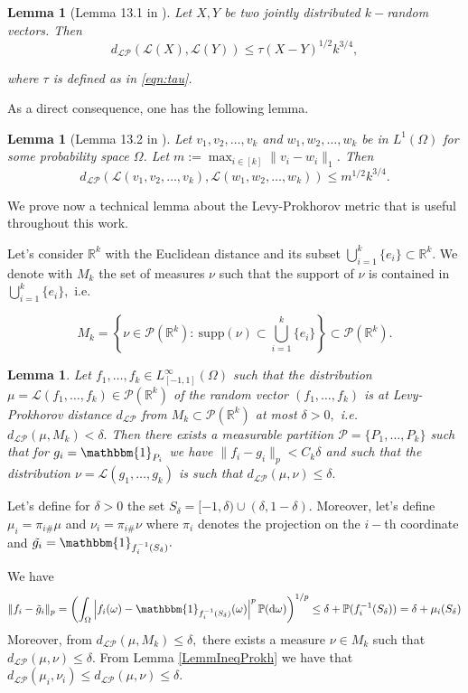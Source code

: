 \documentclass[11pt]{article}
\newtheorem{lemma}[theorem]{Lemma}
\def\R{\mathbb{R}}
\def\P{\mathbb{P}}
\newcommand{\cP}{{\mathcal P}}  %
\renewcommand{\P}{\mathbb{P}}
\newcommand{\drv}{\mathrm{d}}
\begin{document}
\begin{lemma}[Lemma 13.1 in \cite{backhausz2018action}]\label{coupdist} Let $X,Y$ be two jointly distributed %
$k-$random vectors. Then $$d_{\mathcal{LP}}(\mathcal{L}(X),\mathcal{L}(Y))\leq \tau(X-Y)^{1/2}k^{3/4},$$

where $\tau$ is defined as in \eqref{eqn:tau}.
\end{lemma}

As a direct consequence, one has the following lemma.

\begin{lemma}[Lemma 13.2 in \cite{backhausz2018action}] \label{coupdist2} 
Let $v_1,v_2,\dots,v_k$ and $w_1,w_2,\dots,w_k$ be in $L^1(\Omega)$ for some probability space $\Omega$. Let $m:=\max_{i\in [k]} \|v_i-w_i\|_1$. Then
$$d_{\mathcal{LP}}(\mathcal{L}(v_1,v_2,\dots,v_k),\mathcal{L}(w_1,w_2,\dots,w_k))\leq m^{1/2}k^{3/4}.$$
\end{lemma}


We prove now a technical lemma about the Levy-Prokhorov metric that is useful throughout this work.


Let's consider $\R^k$ with the Euclidean distance and its subset $\bigcup^k_{i=1}\{e_i\}\subset \R^k.$
We denote with $M_k$ the set of measures $\nu $ such that the support of $\nu$ is contained in $\bigcup^k_{i=1}\{e_i\}, $ i.e.\

$$
M_k=\left\{\nu\in \cP(\R^k):\ \text{supp}(\nu)\subset \bigcup^k_{i=1}\{e_i\}\right\}\subset \cP(\R^k).
$$
\begin{lemma}\label{LemmApproxFunctPartMeas}
Let $f_1,\ldots,f_k\in L_{[-1,1]}^{\infty}(\Omega)$ such that the distribution $\mu=\mathcal{L}(f_1,\ldots, f_k)\in \cP(\R^k)$ of the random vector $(f_1,\ldots,f_k)$ is at Levy-Prokhorov distance $d_{\mathcal{LP}}$ from $M_k\subset \cP(\R^k)$ at most $\delta>0,$ i.e.\ $d_{\mathcal{LP}}(\mu, M_k)<\delta.$  Then there exists a measurable partition $\cP=\{P_1,\ldots, P_k\}$ such that for $g_i=\mathbbm{1}_{P_i}$ we have $\|f_i-g_i\|_p<C_k\delta$ and such that the distribution $\nu=\mathcal{L}(g_1,\ldots,g_k)$ is such that $d_{\mathcal{LP}}(\mu, \nu)\leq \delta.$   
\end{lemma}
\proof
 Let's define for $\delta>0$ the set $S_{\delta}=[-1,\delta)\cup (\delta,1-\delta).$  Moreover, let's define $\mu_i=\pi_{i\#}\mu$ and $\nu_i=\pi_{i\#}\nu$ where $\pi_i$ denotes the projection on the $i-$th coordinate and $\tilde{g_i}=\mathbbm{1}_{f_i^{-1}(S_{\delta})}.$ 

We have $$\|f_i-\tilde{g}_i\|_p=\left(\int_{\Omega}\left|f_i(\omega)-\mathbbm{1}_{f_i^{-1}(S_{\delta})}(\omega) \right|^p\P(\drv \omega)\right)^{1/p}\leq  \delta+ \P(f_i^{-1}(S_{\delta}))=\delta+\mu_i(S_{\delta})$$
Moreover, from $d_{\mathcal{LP}}(\mu, M_k)\leq \delta,$ there exists a measure $\nu \in M_k$ such that $d_{\mathcal{LP}}(\mu, \nu)\leq \delta.$ From Lemma \ref{LemmIneqProkh} we have that $d_{\mathcal{LP}}(\mu_i, \nu_i)\leq d_{\mathcal{LP}}(\mu, \nu)\leq \delta.$
\end{document}
